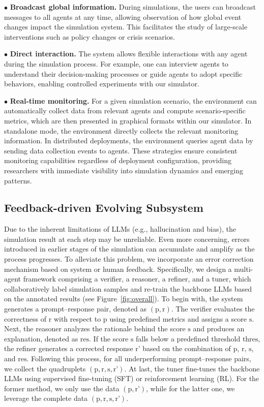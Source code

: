 \documentclass{article}
\theoremstyle{definition}
\theoremstyle{theorem}
\theoremstyle{proof}
\theoremstyle{remark}
\begin{document}
    $\bullet$ \textbf{Broadcast global information.}
    During simulations, the users can broadcast messages to all agents at any time, allowing observation of how global event changes impact the simulation system. This facilitates the study of large-scale interventions such as policy changes or crisis scenarios.

    $\bullet$ \textbf{Direct interaction.} 
    The system allows flexible interactions with any agent during the simulation process. For example, one can interview agents to understand their decision-making processes or guide agents to adopt specific behaviors, enabling controlled experiments with our simulator.

    $\bullet$ \textbf{Real-time monitoring.}
    For a given simulation scenario, the environment can automatically collect data from relevant agents and compute scenario-specific metrics, which are then presented in graphical formats within our simulator.
    In standalone mode, the environment directly collects the relevant monitoring information. In distributed deployments, the environment queries agent data by sending data collection events to agents. These strategies ensure consistent monitoring capabilities regardless of deployment configuration, providing researchers with immediate visibility into simulation dynamics and emerging patterns.
    
    \subsection{Feedback-driven Evolving Subsystem}
    Due to the inherent limitations of LLMs (e.g., hallucination and bias), the simulation result at each step may be unreliable. Even more concerning, errors introduced in earlier stages of the simulation can accumulate and amplify as the process progresses. 
    To alleviate this problem, we incorporate an error correction mechanism based on system or human feedback. 
    Specifically, we design a multi-agent framework comprising a verifier, a reasoner, a refiner, and a tuner, which collaboratively label simulation samples and re-train the backbone LLMs based on the annotated results (see Figure~\ref{fig:overall}).
    To begin with, the system generates a prompt–response pair, denoted as $(\text{p}, \text{r})$.
    The verifier evaluates the correctness of $\text{r}$ with respect to $\text{p}$ using predefined metrics and assigns a score $\text{s}$.
    Next, the reasoner analyzes the rationale behind the score $\text{s}$ and produces an explanation, denoted as $\text{res}$. 
    If the score $\text{s}$ falls below a predefined threshold $\text{thres}$, the refiner generates a corrected response $\text{r'}$ based on the combination of $\text{p}$, $\text{r}$, $\text{s}$, and $\text{res}$.
    Following this process, for all underperforming prompt–response pairs, we collect the quadruplets $(\text{p}, \text{r}, \text{s}, \text{r'})$.
    At last, the tuner fine-tunes the backbone LLMs using supervised fine-tuning (SFT) or reinforcement learning (RL). For the former method, we only use the data $(\text{p}, \text{r'})$, while for the latter one, we leverage the complete data $(\text{p}, \text{r}, \text{s}, \text{r'})$.
    
\end{document}
